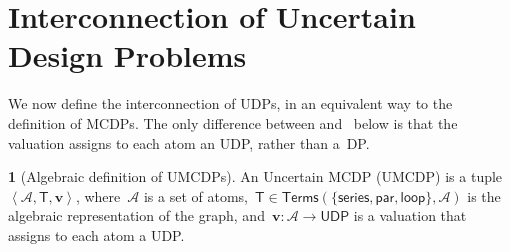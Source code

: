 \documentclass[twocolumn,english]{IEEEconf}
\theoremstyle{plain}
\theoremstyle{definition}
\theoremstyle{definition}
\newtheorem{defn}[thm]{\protect\definitionname}
\theoremstyle{plain}
\newcommand{\aword}[1]{\mathsf{#1}}
\newcommand{\vmath}[1]{\aword{#1}}
\newcommand{\dpseries}{\vmath{series}}
\newcommand{\dppar}{\vmath{par}}
\newcommand{\dploop}{\vmath{loop}}
\newcommand{\udpsp}{\vmath{UDP}}
\newcommand{\terms}{\vmath{Terms}}
\newcommand{\atoms}{\mathcal{A}}
\newcommand{\atree}{\boldsymbol{\vmath{T}}}
\newcommand{\val}{\boldsymbol{v}}
\providecommand{\definitionname}{Definition}
\begin{document}
\section{Interconnection of Uncertain Design Problems\label{sec:UMCDP}}

We now define the interconnection of UDPs, in an equivalent way to
the definition of MCDPs. The only difference between 
and~ below is that the valuation assigns to
each atom an UDP, rather than a~DP.
\begin{defn}[Algebraic definition of UMCDPs]
\label{def:umcdp}An Uncertain MCDP (UMCDP) is a tuple~$\left\langle \atoms,\atree,\val\right\rangle $,
where~$\atoms$ is a set of atoms,~$\atree\in\terms(\{\dpseries,\dppar,\dploop\},\atoms)$
is the algebraic representation of the graph, and~$\val:\atoms\rightarrow\udpsp$
is a valuation that assigns to each atom a UDP.
\end{defn}
\end{document}
